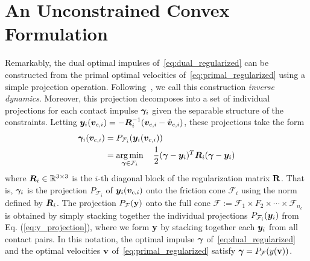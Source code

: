 
\section{An Unconstrained Convex Formulation}
\label{sec:unconstrained_convex_formulation}
Remarkably,  the dual optimal impulses of~\eqref{eq:dual_regularized} can be constructed from 
the primal optimal velocities of~\eqref{eq:primal_regularized}
using a simple projection operation. 
 Following~\cite{bib:todorov2014}, we call this construction  \textit{inverse dynamics}. 
 Moreover, this projection
decomposes into a set of individual projections for each
contact impulse ${\bm\gamma}_i$ given the separable structure of the constraints.
Letting ${\bm{y}}_i({\bm{v}}_{c,i}) = -{\bm{R}}_i^{-1}({\bm{v}}_{c,i}-\hat{{\bm{v}}}_{c,i})$,
these projections take the form
\begin{equation}
  \begin{aligned}
	\bgamma_i(\vf{v}_{c,i})&= P_{\mathcal{F}_i}(\vf{y}_i(\vf{v}_{c,i}))\\
	&= \argmin_{\bgamma\in\mathcal{F}_i} \quad 
		\frac{1}{2}(\bgamma-\vf{y}_i)^T\vf{R}_i(\bgamma-\vf{y}_i)\\
	\end{aligned}
	\label{eq:y_projection}
\end{equation}
where ${\bm{R}}_i\in\mathbb{R}^{3\times3}$ is the $i\text{-th}$ diagonal block of
the regularization matrix ${\mathbf{R}}$. That is, ${\bm\gamma}_i$ is the projection
$P_{\mathcal{F}_i}$ of ${\bm{y}}_i({\bm{v}}_{c,i})$ onto the friction cone
$\mathcal{F}_i$ using the norm defined by ${\bm{R}}_i$.
The projection $P_{\mathcal{F}}({\mathbf{y}})$ onto 
the full cone $\mathcal{F} :=
\mathcal{F}_1 \times F_2 \times \cdots \times \mathcal{F}_{n_c}$ 
is obtained by simply stacking together the individual projections
$P_{\mathcal{F}_i}({\bm{y}}_i)$ from Eq. (\ref{eq:y_projection}),
where we form ${\mathbf{y}}$ by stacking together each
${\bm{y}}_i$ from all contact pairs.  In this notation,
the optimal impulse ${\bm\gamma}$ of~\eqref{eq:dual_regularized} 
and the optimal velocities ${\mathbf{v}}$ of~\eqref{eq:primal_regularized} 
satisfy  ${\bm\gamma} = P_{\mathcal{F}}(y({\mathbf{v}}))$.



